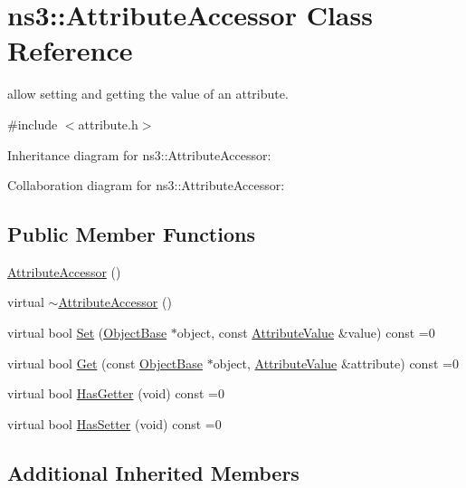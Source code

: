 \hypertarget{classns3_1_1AttributeAccessor}{}\section{ns3\+:\+:Attribute\+Accessor Class Reference}
\label{classns3_1_1AttributeAccessor}


allow setting and getting the value of an attribute.  




{\ttfamily \#include $<$attribute.\+h$>$}



Inheritance diagram for ns3\+:\+:Attribute\+Accessor\+:


Collaboration diagram for ns3\+:\+:Attribute\+Accessor\+:
\subsection*{Public Member Functions}
\begin{DoxyCompactItemize}
\item 
\hyperlink{classns3_1_1AttributeAccessor_a037bf18e592cd6389a4eed978449a9e1}{Attribute\+Accessor} ()
\item 
virtual \hyperlink{classns3_1_1AttributeAccessor_af544987c43fc97832fcdd0bb6cbd71b9}{$\sim$\+Attribute\+Accessor} ()
\item 
virtual bool \hyperlink{classns3_1_1AttributeAccessor_a61b3a2aa1eeec418c17a723ab9b1c8d3}{Set} (\hyperlink{classns3_1_1ObjectBase}{Object\+Base} $\ast$object, const \hyperlink{classns3_1_1AttributeValue}{Attribute\+Value} \&value) const =0
\item 
virtual bool \hyperlink{classns3_1_1AttributeAccessor_a27d81b679bf47f482e54e83e9829f01e}{Get} (const \hyperlink{classns3_1_1ObjectBase}{Object\+Base} $\ast$object, \hyperlink{classns3_1_1AttributeValue}{Attribute\+Value} \&attribute) const =0
\item 
virtual bool \hyperlink{classns3_1_1AttributeAccessor_a04328fa538b8f9d39803ab84b1f66595}{Has\+Getter} (void) const =0
\item 
virtual bool \hyperlink{classns3_1_1AttributeAccessor_aec95a2c081375963f6594c6e1f15f92b}{Has\+Setter} (void) const =0
\end{DoxyCompactItemize}
\subsection*{Additional Inherited Members}


